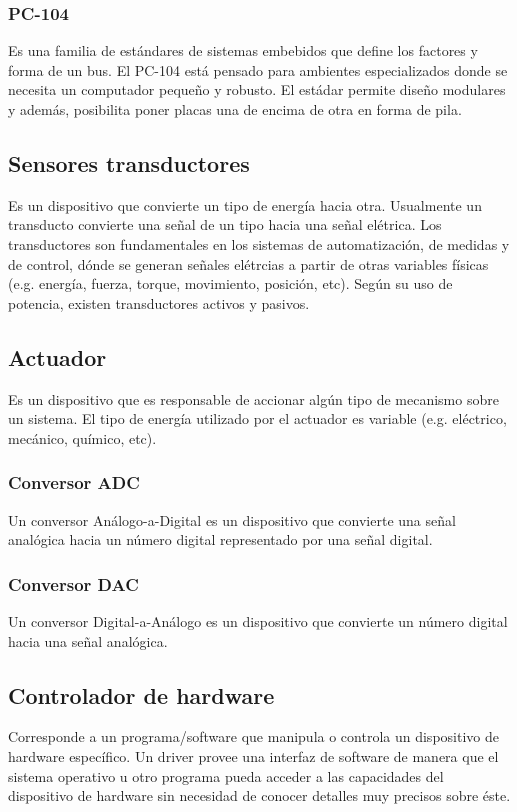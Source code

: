\documentclass[11pt,letterpaper]{article}
\begin{document}
\subsubsection{PC-104}
Es una familia de estándares de sistemas embebidos que define los factores y forma de un bus. El PC-104 está pensado para ambientes especializados donde se necesita un computador pequeño y robusto. El estádar permite diseño modulares y además, posibilita poner placas una de encima de otra en forma de pila.
\subsection{Sensores transductores}
Es un dispositivo que convierte un tipo de energía hacia otra. Usualmente un transducto convierte una señal de un tipo hacia una señal el\'etrica. 
Los transductores son fundamentales en los sistemas de automatización, de medidas y de control, dónde se generan señales el\'etrcias a partir de otras variables físicas (e.g. energía, fuerza, torque, movimiento, posición, etc). Según su uso de potencia, existen transductores activos y pasivos.

\subsection{Actuador}
Es un dispositivo que es responsable de accionar algún tipo de mecanismo sobre un sistema. El tipo de energía utilizado por el actuador es variable (e.g. el\'ectrico, mecánico, químico, etc).
\subsubsection{Conversor ADC}
Un conversor Análogo-a-Digital es un dispositivo que convierte una señal analógica hacia un número digital representado por una señal digital.
\subsubsection{Conversor DAC}
Un conversor Digital-a-Análogo es un dispositivo que convierte un número digital hacia una señal analógica.
\subsection{Controlador de hardware}
Corresponde a un programa/software que manipula o controla un dispositivo de hardware específico. Un driver provee una interfaz de software de manera que el sistema operativo u otro programa pueda acceder a las capacidades del dispositivo de hardware sin necesidad de conocer detalles muy precisos sobre \'este.
\end{document}
